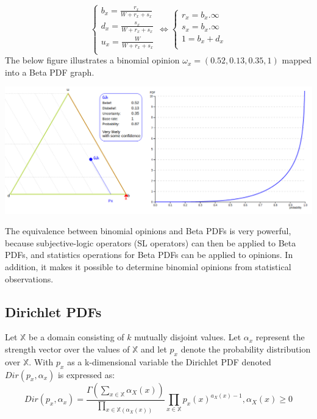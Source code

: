 \documentclass[UTF8]{article}
\newcommand{\opinion}[5]{$\omega_{#1} = (#2, #3, #4, #5)$}
\begin{document}
$$
\begin{cases}
    b_x = \frac{r_x}{W + r_x + s_x}\\
    d_x = \frac{s_x}{W + r_x + s_x}\\
    u_x = \frac{W}{W + r_x + s_x}\\
\end{cases}
\Leftrightarrow
\begin{cases}
    r_x = b_x . \infty\\
    s_x = b_x . \infty\\
    1 = b_x + d_x\\
\end{cases}
$$
The below figure illustrates a binomial opinion \opinion{x}{0.52}{0.13}{0.35}{1} mapped into a Beta PDF graph.
\begin{center}
\includegraphics[width=6in]{images/add1viz.png}
\end{center}

The equivalence between binomial opinions and Beta PDFs is very powerful,
because subjective-logic operators (SL operators) can then be applied to Beta PDFs,
and statistics operations for Beta PDFs can be applied to opinions. In addition, it
makes it possible to determine binomial opinions from statistical observations.

\subsection{Dirichlet PDFs}
Let $\mathbb{X}$ be a domain consisting of $k$ mutually disjoint values. Let $\alpha_x$ represent the strength vector over the values of $\mathbb{X}$ and let $p_x$ denote the probability distribution over $\mathbb{X}$. With $p_x$ as a k-dimensional variable the Dirichlet PDF denoted $Dir(p_x, \alpha_x)$ is expressed as:
$$
Dir(p_x, \alpha_x) = \frac{\Gamma\left(\sum_{x \in \mathbb{X}} \alpha_X(x)\right)}{\prod_{x \in \mathbb{X}(\alpha_X(x))}}\prod_{x \in \mathbb{X}}p_x(x)^{a_X(x) - 1},   \alpha_X(x) \geq 0
$$
\end{document}
